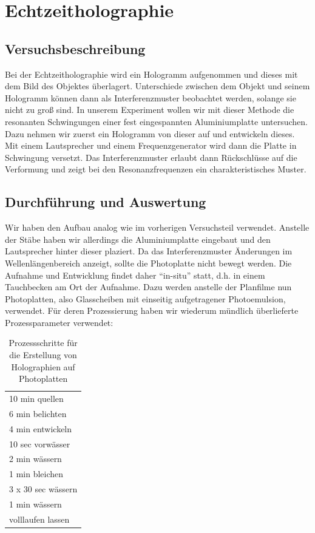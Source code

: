 \section{Echtzeitholographie}
\subsection{Versuchsbeschreibung}
Bei der Echtzeitholographie wird ein Hologramm aufgenommen und dieses mit dem Bild des Objektes überlagert. Unterschiede zwischen dem Objekt und seinem Hologramm können dann als Interferenzmuster beobachtet werden, solange sie nicht zu groß sind. In unserem Experiment wollen wir mit dieser Methode die resonanten Schwingungen einer fest eingespannten Aluminiumplatte untersuchen. Dazu nehmen wir zuerst ein Hologramm von dieser auf und entwickeln dieses. Mit einem Lautsprecher und einem Frequenzgenerator wird dann die Platte in Schwingung versetzt. Das Interferenzmuster erlaubt dann Rückschlüsse auf die Verformung und zeigt bei den Resonanzfrequenzen ein charakteristisches Muster.

\subsection{Durchführung und Auswertung}

Wir haben den Aufbau analog wie im vorherigen Versuchsteil verwendet. Anstelle der Stäbe haben wir allerdings die Aluminiumplatte eingebaut und den Lautsprecher hinter dieser plaziert. Da das Interferenzmuster Änderungen im Wellenlängenbereich anzeigt, sollte die Photoplatte nicht bewegt werden. Die Aufnahme und Entwicklung findet daher "`in-situ"' statt, d.h. in einem Tauchbecken am Ort der Aufnahme. Dazu werden anstelle der Planfilme nun Photoplatten, also Glasscheiben mit einseitig aufgetragener Photoemulsion, verwendet. Für deren Prozessierung haben wir wiederum mündlich überlieferte \cite{lena_christian} Prozessparameter verwendet:

\begin{center}
\begin{table}[H]
\centering
 \begin{tabular}{l}
  \toprule
  10 min quellen\\
  6 min belichten\\
  4 min entwickeln\\
  10 sec vorwässer\\
  2 min wässern\\
  1 min bleichen\\
  3 x 30 sec wässern\\
  1 min wässern\\
  volllaufen lassen\\
 \bottomrule
 \end{tabular}
 \caption{Prozessschritte für die Erstellung von Holographien auf Photoplatten}
\end{table}
\end{center}


